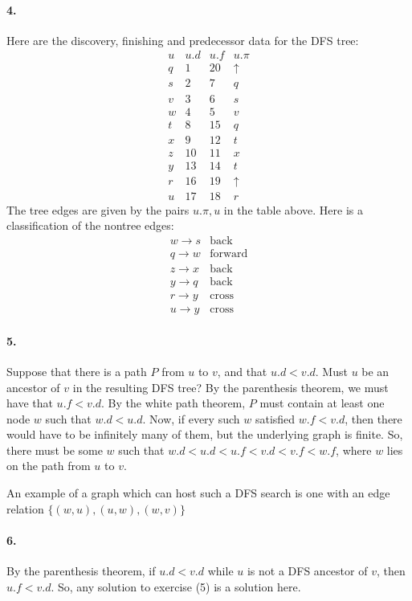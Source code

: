 \documentclass[
]{article}
\begin{document}
\paragraph{4.} Here are the discovery, finishing and predecessor data for the DFS tree:
\[
\begin{array}{cccc}
u & u.d & u.f & u.\pi\\
  \hline
  q & 1 & 20 & \uparrow \\
  s & 2 & 7 & q\\
  v & 3 & 6 & s\\
  w & 4 & 5 & v\\
  t & 8 & 15 & q\\
  x & 9 & 12 & t\\
  z & 10 & 11 & x\\
  y & 13 & 14 & t\\
  r & 16 & 19 & \uparrow\\
  u & 17 & 18 & r
\end{array}
\]
The tree edges are given by the pairs $u.\pi,u$ in the table above.  Here is a classification of the nontree edges:
\[
\begin{array}{cc}
  w\to s & \text{back}\\
  q \to w & \text{forward}\\
  z\to x & \text{back}\\
  y\to q & \text{back}\\
  r\to y & \text{cross}\\
  u\to y & \text{cross}
\end{array}
\]

\paragraph{5.} Suppose that there is a path $P$ from $u$ to $v$, and that $u.d<v.d$.  Must $u$ be an ancestor of $v$ in the resulting DFS tree?  By the parenthesis theorem, we must have that $u.f<v.d$.  By the white path theorem, $P$ must contain at least one node $w$ such that $w.d<u.d$. Now, if every such $w$ satisfied $w.f<v.d$, then there would have to be infinitely  many of them, but the underlying graph is finite.  So, there must be some $w$ such that $w.d<u.d<u.f<v.d<v.f<w.f$, where $w$ lies on the path from $u$ to $v$.  

An example of a graph which can host such a DFS search is one with an edge relation $\{(w,u), (u, w), (w, v)\}$

\paragraph{6.} By the parenthesis theorem, if $u.d<v.d$ while $u$ is not a DFS ancestor of $v$, then $u.f < v.d$.  So, any solution to exercise (5) is a solution here.
\end{document}
